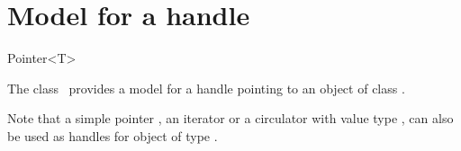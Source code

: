 \section{Model for a handle}



\begin{ccClassTemplate} {Pointer<T>}


\ccThreeToTwo



The class \ccClassTemplateName\ provides a model for a handle
pointing to an object
of class . 


Note that a simple pointer ,
an iterator or a circulator with value type ,
can also be used as handles for object of type  .


\end{ccClassTemplate} 
